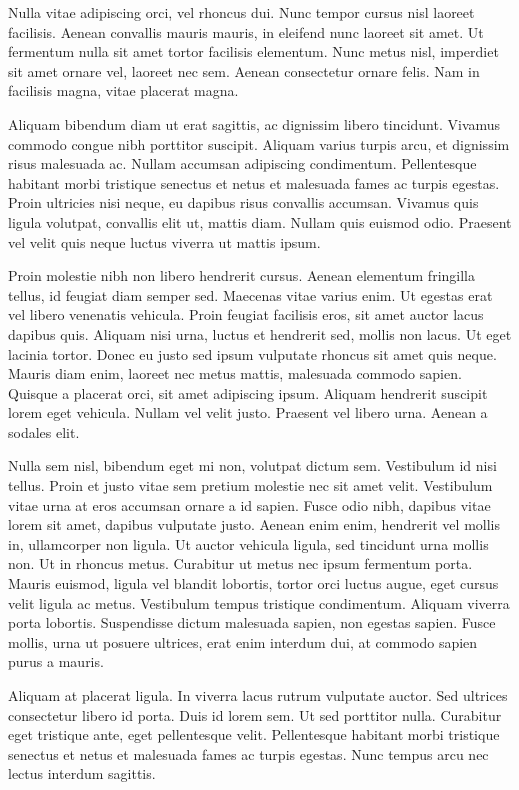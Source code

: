 \documentclass[2pt,a4paper,twoside ]{article}
\begin{document}
\begin{multicols}{2}
Nulla vitae adipiscing orci, vel rhoncus dui. Nunc tempor cursus nisl laoreet facilisis. Aenean convallis mauris mauris, in eleifend nunc laoreet sit amet. Ut fermentum nulla sit amet tortor facilisis elementum. Nunc metus nisl, imperdiet sit amet ornare vel, laoreet nec sem. Aenean consectetur ornare felis. Nam in facilisis magna, vitae placerat magna.

Aliquam bibendum diam ut erat sagittis, ac dignissim libero tincidunt. Vivamus commodo congue nibh porttitor suscipit. Aliquam varius turpis arcu, et dignissim risus malesuada ac. Nullam accumsan adipiscing condimentum. Pellentesque habitant morbi tristique senectus et netus et malesuada fames ac turpis egestas. Proin ultricies nisi neque, eu dapibus risus convallis accumsan. Vivamus quis ligula volutpat, convallis elit ut, mattis diam. Nullam quis euismod odio. Praesent vel velit quis neque luctus viverra ut mattis ipsum.

Proin molestie nibh non libero hendrerit cursus. Aenean elementum fringilla tellus, id feugiat diam semper sed. Maecenas vitae varius enim. Ut egestas erat vel libero venenatis vehicula. Proin feugiat facilisis eros, sit amet auctor lacus dapibus quis. Aliquam nisi urna, luctus et hendrerit sed, mollis non lacus. Ut eget lacinia tortor. Donec eu justo sed ipsum vulputate rhoncus sit amet quis neque. Mauris diam enim, laoreet nec metus mattis, malesuada commodo sapien. Quisque a placerat orci, sit amet adipiscing ipsum. Aliquam hendrerit suscipit lorem eget vehicula. Nullam vel velit justo. Praesent vel libero urna. Aenean a sodales elit.

Nulla sem nisl, bibendum eget mi non, volutpat dictum sem. Vestibulum id nisi tellus. Proin et justo vitae sem pretium molestie nec sit amet velit. Vestibulum vitae urna at eros accumsan ornare a id sapien. Fusce odio nibh, dapibus vitae lorem sit amet, dapibus vulputate justo. Aenean enim enim, hendrerit vel mollis in, ullamcorper non ligula. Ut auctor vehicula ligula, sed tincidunt urna mollis non. Ut in rhoncus metus. Curabitur ut metus nec ipsum fermentum porta. Mauris euismod, ligula vel blandit lobortis, tortor orci luctus augue, eget cursus velit ligula ac metus. Vestibulum tempus tristique condimentum. Aliquam viverra porta lobortis. Suspendisse dictum malesuada sapien, non egestas sapien. Fusce mollis, urna ut posuere ultrices, erat enim interdum dui, at commodo sapien purus a mauris.

Aliquam at placerat ligula. In viverra lacus rutrum vulputate auctor. Sed ultrices consectetur libero id porta. Duis id lorem sem. Ut sed porttitor nulla. Curabitur eget tristique ante, eget pellentesque velit. Pellentesque habitant morbi tristique senectus et netus et malesuada fames ac turpis egestas. Nunc tempus arcu nec lectus interdum sagittis.


\end{multicols}
\end{document}
